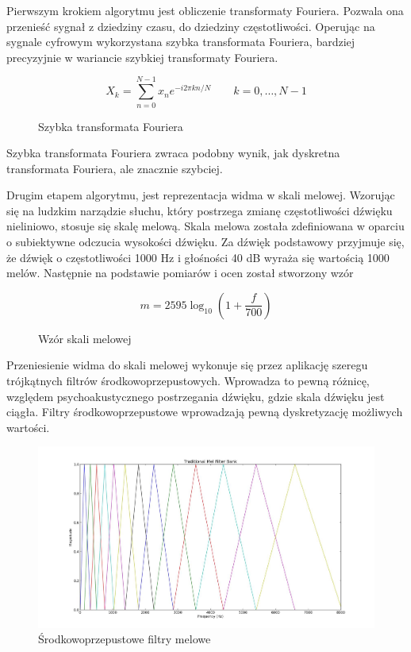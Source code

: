 \documentclass[a4paper,12pt,twoside,openany]{report}
\begin{document}
Pierwszym krokiem algorytmu jest obliczenie transformaty Fouriera. 
Pozwala ona przenieść sygnał z dziedziny czasu, do dziedziny częstotliwości. 
Operując na sygnale cyfrowym wykorzystana szybka transformata Fouriera,
bardziej precyzyjnie w wariancie szybkiej transformaty Fouriera. 
\begin{figure}[h]
	\begin{equation}
		X_{k}=\sum _{n=0}^{N-1}x_{n}e^{-i2\pi kn/N}\qquad k=0,\dots ,N-1
	\end{equation}
	\caption{Szybka transformata Fouriera}
\end{figure}
Szybka transformata Fouriera zwraca podobny wynik, jak dyskretna transformata Fouriera,
ale znacznie szybciej.

Drugim etapem algorytmu, jest reprezentacja widma w skali melowej. 
Wzorując się na ludzkim narządzie słuchu, 
który postrzega zmianę częstotliwości dźwięku nieliniowo, stosuje się skalę melową.
Skala melowa została zdefiniowana w oparciu o subiektywne odczucia wysokości dźwięku.
Za dźwięk podstawowy przyjmuje się, że dźwięk o częstotliwości 1000 Hz i głośności 40 dB wyraża się wartością 1000 melów.
Następnie na podstawie pomiarów i ocen został stworzony wzór
\begin{figure}[h]
	\begin{equation}
		m=2595\log _{10}\left(1+{\frac {f}{700}}\right)
	\end{equation}
	\caption{Wzór skali melowej}
\end{figure}
Przeniesienie widma do skali melowej wykonuje się przez aplikację szeregu trójkątnych filtrów środkowoprzepustowych. 
Wprowadza to pewną różnicę, względem psychoakustycznego postrzegania dźwięku, gdzie skala dźwięku jest ciągła.
Filtry środkowoprzepustowe wprowadzają pewną dyskretyzację możliwych wartości.
\begin{figure}[h]
	\centering
	\includegraphics[width=\textwidth]{melfilterbank}
	\caption{Środkowoprzepustowe filtry melowe}
	\label{rys:mfcc:melfilterbank}
\end{figure}
\end{document}
